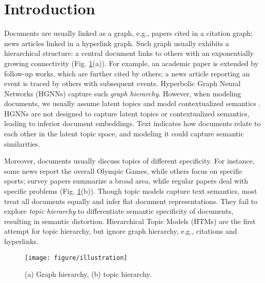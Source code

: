 \section{Introduction}

Documents are usually linked as a graph, e.g., papers cited in a citation graph; news articles linked in a hyperlink graph. Such graph usually exhibits a hierarchical structure:
a central document links to others with an exponentially growing connectivity (Fig. \ref{fig:illustration}(a)). For example, an academic paper is extended by follow-up works, which are further cited by others; a news article reporting an event is traced by others with subsequent events. Hyperbolic Graph Neural Networks (HGNNs) \cite{hgcn} capture such \emph{graph hierarchy}. However, when modeling documents, we usually assume latent topics \cite{lda} and model contextualized semantics \cite{transformer}. HGNNs are not designed to capture latent topics or contextualized semantics, leading to inferior document embeddings. Text indicates how documents relate to each other in the latent topic space, and modeling it could capture semantic similarities. %

Moreover, documents usually discuss topics of different specificity. For instance, some news report the overall Olympic Games, while others focus on specific sports; survey papers summarize a broad area, while regular papers deal with specific problems (Fig. \ref{fig:illustration}(b)). Though topic models \cite{wu2023effective,wu2024fastopic,wu2024survey} capture text semantics, most treat all documents equally and infer flat document representations. They fail to explore \emph{topic hierarchy} to differentiate semantic specificity of documents, resulting in semantic distortion. Hierarchical Topic Models (HTMs) \cite{ncrp} are the first attempt for topic hierarchy, but ignore graph hierarchy, e.g., citations and hyperlinks.

\begin{figure}%
	\centering
	\texttt{[image: figure/illustration]}
	\vspace{-0.4cm}
	\caption{(a) Graph hierarchy, (b) topic hierarchy.}
	\label{fig:illustration}
	\vspace{-0.5cm}
\end{figure}

